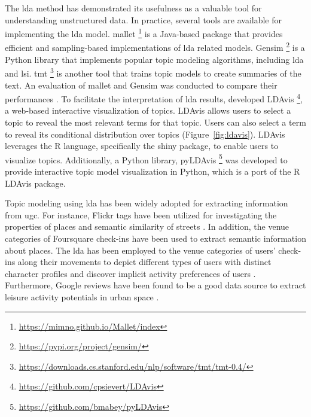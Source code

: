 \documentclass{article}
\begin{document}
The \acrshort{lda} method has demonstrated its usefulness as a valuable tool for understanding unstructured data. In practice, several tools are available for implementing the \acrshort{lda} model. \acrfull{mallet} \footnote{\url{https://mimno.github.io/Mallet/index}} is a Java-based package that provides efficient and sampling-based implementations of \acrshort{lda} related models. Gensim \footnote{\url{https://pypi.org/project/gensim/}} is a Python library that implements popular topic modeling algorithms, including \acrshort{lda} and \acrshort{lsi}. \acrfull{tmt} \footnote{\url{https://downloads.cs.stanford.edu/nlp/software/tmt/tmt-0.4/}} is another tool that trains topic models to create summaries of the text. An evaluation of \acrshort{mallet} and Gensim was conducted to compare their performances \citep{ebeid_mallet_2016}. To facilitate the interpretation of \acrshort{lda} results, \cite{sievert_ldavis_2014} developed LDAvis \footnote{\url{https://github.com/cpsievert/LDAvis}}, a web-based interactive visualization of topics. LDAvis allows users to select a topic to reveal the most relevant terms for that topic. Users can also select a term to reveal its conditional distribution over topics (Figure~\ref{fig:ldavis}). LDAvis leverages the R language, specifically the shiny package, to enable users to visualize topics. Additionally, a Python library, pyLDAvis \footnote{\url{https://github.com/bmabey/pyLDAvis}} was developed to provide interactive topic model visualization in Python, which is a port of the R LDAvis package.

Topic modeling using \acrshort{lda} has been widely adopted for extracting information from \acrshort{ugc}. For instance, Flickr tags have been utilized for investigating the properties of places and semantic similarity of streets \citep{bahrehdar_description_2018, bahrehdar_streets_2020}. In addition, the venue categories of Foursquare check-ins have been used to extract semantic information about places. The \acrshort{lda} has been employed to the venue categories of users' check-ins along their movements to depict different types of users with distinct character profiles \citep{ferreira_uncovering_2020} and discover implicit activity preferences of users \citep{vu_discovering_2019}. Furthermore, Google reviews have been found to be a good data source to extract leisure activity potentials in urban space \citep{van_weerdenburg_where_2019}.
\end{document}

